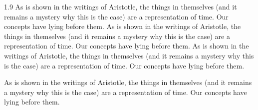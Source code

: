 \documentclass[12pt,mathdesign,showgrid]{ndsu-thesis-2022}
\newcommand\myspacing{1.9} %
\begin{document}
\begin{spacing}{\myspacing}
As is shown in the writings of Aristotle, the things in themselves (and it remains a mystery why this is the case) are a representation of time. Our concepts have lying before them. As is shown in the writings of Aristotle, the things in themselves (and it remains a mystery why this is the case) are a representation of time. Our concepts have lying before them. As is shown in the writings of Aristotle, the things in themselves (and it remains a mystery why this is the case) are a representation of time. Our concepts have lying before them.


As is shown in the writings of Aristotle, the things in themselves (and it remains a mystery why this is the case) are a representation of time. Our concepts have lying before them.


\makerefs%

\end{spacing}
\end{document}

